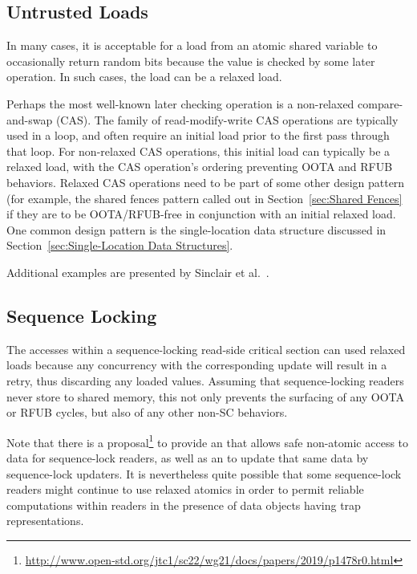 \documentclass[10]{article}
\begin{document}
\subsection{Untrusted Loads}
\label{sec:Untrusted Loads}

In many cases, it is acceptable for a load from an atomic shared variable
to occasionally return random bits because the value is checked by
some later operation.
In such cases, the load can be a relaxed load.

Perhaps the most well-known later checking operation is a non-relaxed
compare-and-swap (CAS).
The  family of read-modify-write
CAS operations are typically used in a loop, and often require an initial
load prior to the first pass through that loop.
For non-relaxed CAS operations, this initial load can typically be a
relaxed load, with the CAS operation's ordering preventing OOTA and RFUB
behaviors.
Relaxed CAS operations need to be part of some other design pattern
(for example, the shared fences pattern called out in
Section~\ref{sec:Shared Fences}
if they are to be OOTA/RFUB-free in conjunction with an initial relaxed
load.
One common design pattern is the single-location data structure discussed in
Section~\ref{sec:Single-Location Data Structures}.

Additional examples are presented by
Sinclair et al.~\cite{Sinclair:2017:CAR:3079856.3080206}.

\subsection{Sequence Locking}
\label{sec:Sequence Locking}

The accesses within a sequence-locking read-side critical section
can used relaxed loads because any concurrency with the corresponding
update will result in a retry, thus discarding any loaded values.
Assuming that sequence-locking readers never store to shared memory,
this not only prevents the surfacing of any OOTA or RFUB cycles, but
also of any other non-SC behaviors.

Note that there is a proposal\footnote{
	\url{http://www.open-std.org/jtc1/sc22/wg21/docs/papers/2019/p1478r0.html}}
to provide an  that allows safe
non-atomic access to data for sequence-lock readers, as well as an
 to update that same data by
sequence-lock updaters.
It is nevertheless quite possible that some sequence-lock readers
might continue to use relaxed atomics in order to permit reliable
computations within readers in the presence of data objects having
trap representations.
\end{document}
